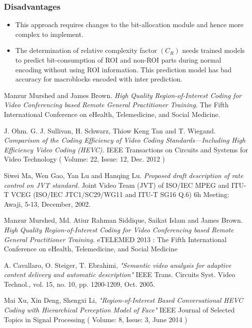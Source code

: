 \documentclass[11pt]{article} %
\begin{document}
\subsubsection*{Disadvantages}
\begin{itemize}
\item This approach requires changes to the bit-allocation module and hence more complex to implement.
\item The determination of relative complexity factor $(C_R)$ needs trained models to predict bit-consumption of ROI and non-ROI parts during normal encoding without using ROI information. This prediction model has bad accuracy for macroblocks encoded with inter prediction. 
\end{itemize}
%
%
%
%
%
\clearpage
\begin{thebibliography}{9}
Manzur Murshed and James Brown. 
\textit{High Quality Region-of-Interest Coding for Video Conferencing based Remote General Practitioner Training}. 
The Fifth International Conference on eHealth, Telemedicine, and Social Medicine.

J. Ohm. G. J. Sullivan, H. Schwarz, Thiow Keng Tan and T. Wiegand.
\textit{Comparison of the Coding Efficiency of Video Coding Standards—Including High Efficiency Video Coding (HEVC).}
 IEEE Transactions on Circuits and Systems for Video Technology ( Volume: 22, Issue: 12, Dec. 2012 )

Siwei Ma, Wen Gao, Yan Lu and Hanqing Lu.
\textit{Proposed draft description of rate control on JVT standard. }
Joint Video Team (JVT) of ISO/IEC MPEG and ITU-T VCEG (ISO/IEC JTC1/SC29/WG11 and ITU-T SG16 Q.6) 6h Meeting: Awaji, 5-13, December, 2002.

Manzur Murshed, Md. Atiur Rahman Siddique, Saikat Islam and James Brown.
\textit{High Quality Region-of-Interest Coding for Video Conferencing based Remote General Practitioner Training.}
eTELEMED 2013 : The Fifth International Conference on eHealth, Telemedicine, and Social Medicine

A. Cavallaro, O. Steiger, T. Ebrahimi, \textit{"Semantic video analysis for adaptive content delivery and automatic description"}
IEEE Trans. Circuits Syst. Video Technol., vol. 15, no. 10, pp. 1200-1209, Oct. 2005.

Mai Xu, Xin Deng, Shengxi Li, \textit{"Region-of-Interest Based Conversational HEVC Coding with Hierarchical Perception Model of Face"}
IEEE Journal of Selected Topics in Signal Processing ( Volume: 8, Issue: 3, June 2014 )


\end{thebibliography}
\end{document}
